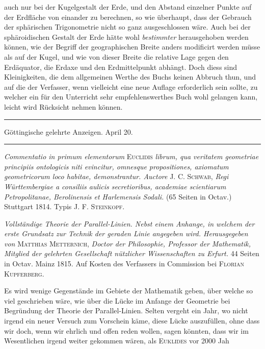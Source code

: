 %
auch nur bei der Kugelgestalt der Erde, und den Abstand einzelner Punkte auf der Erdfläche von einander zu berechnen, so wie überhaupt, dass der Gebrauch der sphärischen Trigonometrie nicht so ganz ausgeschlossen wäre. Auch bei der sphäroidischen Gestalt der Erde hätte wohl \textit{bestimmter} herausgehoben werden können, wie der Begriff der geographischen Breite anders modificirt werden müsse als auf der Kugel, und wie von dieser Breite die relative Lage gegen den Erdäquator, die Erdaxe und den Erdmittelpunkt abhängt. Doch diess sind Kleinigkeiten, die dem allgemeinen Werthe des Buchs keinen Abbruch thun, und auf die der Verfasser, wenn vielleicht eine neue Auflage erforderlich sein sollte, zu welcher ein für den Unterricht sehr empfehlenswerthes Buch wohl gelangen kann, leicht wird Rücksicht nehmen können.

\begin{center}
\rule{.85\textwidth}{.3pt}\par
Göttingische gelehrte Anzeigen. April 20.\par
\rule{.85\textwidth}{.3pt}
\end{center}
\hspace*{\parindent}\textit{Commentatio in primum elementorum} \textsc{Euclidis} \textit{librum, qua veritatem geometriae principiis ontologicis niti evincitur, omnesque propositiones, axiomatum geometricorum loco habitae, demonstrantur. Auctore} \textsc{J. C. Schwab}, \textit{Regi Württembergiae a consiliis aulicis secretioribus, academiae scientiarum Petropolitanae, Berolinensis et Harlemensis Sodali.} (65 Seiten in Octav.) Stuttgart 1814. Typis \textsc{J. F. Steinkopf}.

\textit{Vollständige Theorie der Parallel-Linien. Nebst einem Anhange, in welchem der erste Grundsatz zur Technik der geraden Linie angegeben wird. Herausgegeben von} \textsc{Matthias Metternich}, \textit{Doctor der Philosophie, Professor der Mathematik, Mitglied der gelehrten Gesellschaft nützlicher Wissenschaften zu Erfurt.} 44 Seiten in Octav. Mainz 1815. Auf Kosten des Verfassers in Commission bei \textsc{Florian Kupferberg}.

Es wird wenige Gegenstände im Gebiete der Mathematik geben, über welche so viel geschrieben wäre, wie über die Lücke im Anfange der Geometrie bei Begründung der Theorie der Parallel-Linien. Selten vergeht ein Jahr, wo nicht irgend ein neuer Versuch zum Vorschein käme, diese Lücke auszufüllen, ohne dass wir doch, wenn wir ehrlich und offen reden wollen, sagen könnten, dass wir im Wesentlichen irgend weiter gekommen wären, als \textsc{Euklides} vor 2000 Jah%
